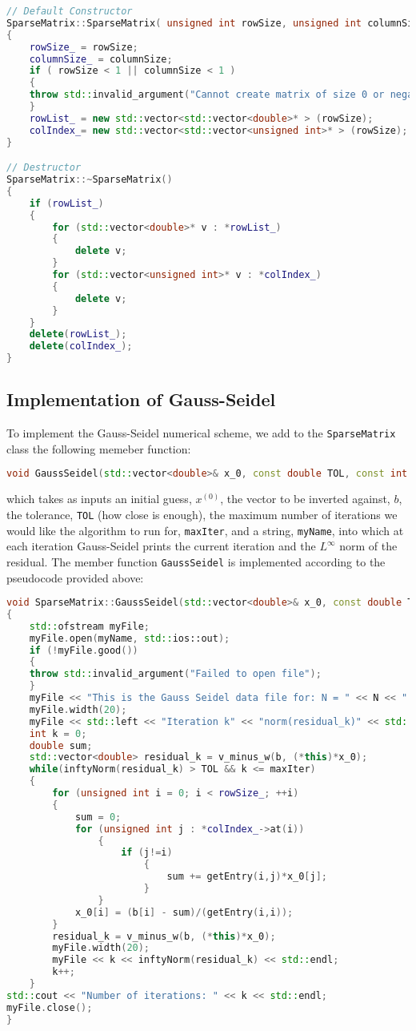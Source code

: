 \documentclass[a4paper,11pt]{article}
\theoremstyle{break}
\theoremstyle{break2}
\theoremstyle{break}
\theoremstyle{break2}
\begin{document}
\begin{lstlisting}[language=c++]
// Default Constructor
SparseMatrix::SparseMatrix( unsigned int rowSize, unsigned int columnSize )
{
	rowSize_ = rowSize;
	columnSize_ = columnSize;
	if ( rowSize < 1 || columnSize < 1 )
	{
	throw std::invalid_argument("Cannot create matrix of size 0 or negative size");
	}
	rowList_ = new std::vector<std::vector<double>* > (rowSize);
	colIndex_= new std::vector<std::vector<unsigned int>* > (rowSize);
}

// Destructor
SparseMatrix::~SparseMatrix()
{
	if (rowList_)
	{
		for (std::vector<double>* v : *rowList_)
		{
			delete v;
		}
		for (std::vector<unsigned int>* v : *colIndex_)
		{
			delete v;
		}
	}
	delete(rowList_);
	delete(colIndex_);
}
\end{lstlisting}

\subsection{Implementation of Gauss-Seidel}
To implement the Gauss-Seidel numerical scheme, we add to the \texttt{SparseMatrix} class the following memeber function:
\begin{lstlisting}[language=c++]
void GaussSeidel(std::vector<double>& x_0, const double TOL, const int maxIter, const std::vector<double>& b, std::string myName);
\end{lstlisting}
which takes as inputs an initial guess, $ x^{(0)} $, the vector to be inverted against, $ b $, the tolerance, \texttt{TOL} (how close is enough), the maximum number of iterations we would like the algorithm to run for, \texttt{maxIter}, and a string, \texttt{myName}, into which at each iteration Gauss-Seidel prints the current iteration and the $ L^{\infty} $ norm of the residual. The member function \texttt{GaussSeidel} is implemented according to the pseudocode provided above:
\begin{lstlisting}[language=c++]
void SparseMatrix::GaussSeidel(std::vector<double>& x_0, const double TOL, const int maxIter, const std::vector<double>& b, std::string myName)
{
	std::ofstream myFile;
	myFile.open(myName, std::ios::out);
	if (!myFile.good())
	{
	throw std::invalid_argument("Failed to open file");
	}
	myFile << "This is the Gauss Seidel data file for: N = " << N << " delta = " << delta << " lambda = " << lambda << std::endl;
	myFile.width(20);
	myFile << std::left << "Iteration k" << "norm(residual_k)" << std::endl;
	int k = 0;
	double sum;
	std::vector<double> residual_k = v_minus_w(b, (*this)*x_0);
	while(inftyNorm(residual_k) > TOL && k <= maxIter)
	{
		for (unsigned int i = 0; i < rowSize_; ++i)
		{
			sum = 0;
			for (unsigned int j : *colIndex_->at(i))
				{
					if (j!=i)
						{
							sum += getEntry(i,j)*x_0[j];
						}
				}
			x_0[i] = (b[i] - sum)/(getEntry(i,i));
		}
		residual_k = v_minus_w(b, (*this)*x_0);
		myFile.width(20);
		myFile << k << inftyNorm(residual_k) << std::endl;
		k++;
	}
std::cout << "Number of iterations: " << k << std::endl;
myFile.close();
}
\end{lstlisting}
\end{document}
